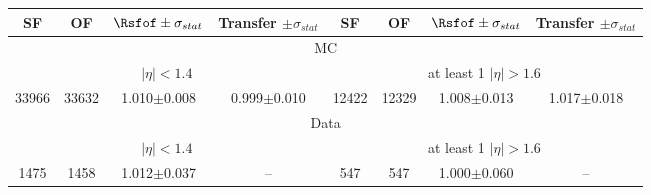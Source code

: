 

\begin{tabular}{c|c|c|c|c|c|c|c}     
 SF & OF & $\Rsfof \pm \sigma_{stat}$ & Transfer $\pm \sigma_{stat}$ &  SF & OF & $\Rsfof \pm \sigma_{stat}$ & Transfer $\pm \sigma_{stat}$  \\    
\hline
 \multicolumn{8}{c}{MC} \\
\hline
  \multicolumn{4}{c|}{$|\eta|<1.4$ } & \multicolumn{4}{|c}{ at least 1 $|\eta| > 1.6$ } \\
\hline 
 33966 & 33632 & 1.010$\pm$0.008 & 0.999$\pm$0.010 & 12422 & 12329 & 1.008$\pm$0.013 & 1.017$\pm$0.018 \\
    
    \hline 
\multicolumn{8}{c}{Data} \\
\hline
  \multicolumn{4}{c|}{$|\eta|<1.4$ } & \multicolumn{4}{|c}{ at least 1 $|\eta| > 1.6$ }\\
\hline
 1475 & 1458 & 1.012$\pm$0.037 & -- & 547 & 547 & 1.000$\pm$0.060 & -- \\
 
  
\end{tabular}  

